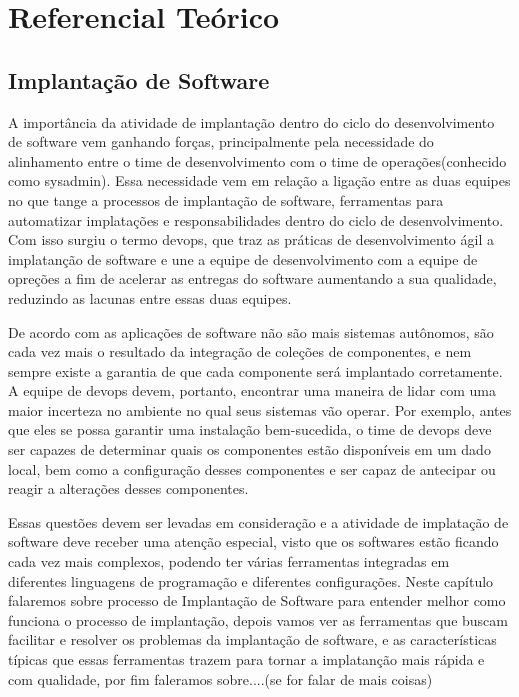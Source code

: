 \chapter{Referencial Teórico}
\label{cap-referencial}

\section{Implantação de Software}

A importância da atividade de implantação dentro do ciclo do desenvolvimento
de software vem ganhando forças, principalmente pela necessidade do alinhamento
entre o time de desenvolvimento com o time de operações(conhecido como sysadmin).
Essa necessidade vem em relação a ligação entre as duas equipes no que tange a
processos de implantação de software, ferramentas para automatizar implatações
e responsabilidades dentro do ciclo de desenvolvimento. Com isso surgiu o termo devops, que
traz as práticas de desenvolvimento ágil a implatanção de software e une a equipe de desenvolvimento
com a equipe de opreções a fim de acelerar as entregas do software aumentando
a sua qualidade, reduzindo as lacunas entre essas duas equipes.

De acordo com \cite{deployment1998} as aplicações de software não são mais
sistemas autônomos, são cada vez mais o resultado da integração de coleções de
componentes, e nem sempre existe a garantia de que cada componente será implantado
corretamente. A equipe de devops devem, portanto, encontrar uma maneira de lidar
com uma maior incerteza no ambiente no qual seus sistemas vão operar.
Por exemplo, antes que eles se possa garantir uma instalação bem-sucedida, o time
de devops deve ser capazes de determinar quais os componentes estão disponíveis
 em um dado local, bem como a configuração desses componentes e ser capaz de
antecipar ou reagir a alterações desses componentes.

Essas questões  devem ser levadas em consideração e a atividade de implatação de
software deve receber uma atenção especial, visto que os softwares estão ficando
cada vez mais complexos, podendo ter várias ferramentas integradas em diferentes
linguagens de programação e diferentes configurações. Neste capítulo falaremos
sobre processo de Implantação de Software
para entender melhor como funciona o processo de implantação, depois vamos ver as
ferramentas que buscam facilitar  e resolver os problemas da implantação de software,
e as características típicas que essas ferramentas trazem para tornar a implatanção
mais rápida e com qualidade, por fim faleramos sobre....(se for falar de mais coisas)

